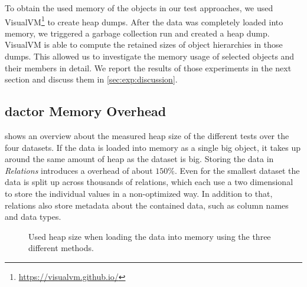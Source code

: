  To obtain the used memory of the objects in our test approaches, we used VisualVM\footnote{\url{https://visualvm.github.io/}} to create heap dumps.
  After the data was completely loaded into memory, we triggered a garbage collection run and created a heap dump.
  VisualVM is able to compute the retained sizes of object hierarchies in those dumps.
  This allowed us to investigate the memory usage of selected objects and their members in detail.
  We report the results of those experiments in the next section and discuss them in \cref{sec:exp:discussion}.

\subsection[Dactor Memory Overhead]{\Gls{dactor} Memory Overhead}

   shows an overview about the measured heap size of the different tests over the four datasets.
  If the data is loaded into memory as a single big  object, it takes up around the same amount of heap as the dataset is big.
  Storing the data in \textit{Relations} introduces a overhead of about $150 \%$.
  Even for the smallest dataset the data is split up across thousands of relations, which each use a two dimensional  to store the individual values in a non-optimized way.
  In addition to that, relations also store metadata about the contained data, such as column names and data types.
  
  \begin{figure}
    \centering
    \caption{Used heap size when loading the data into memory using the three different methods.}
    \label{fig:exp:general}
  \end{figure}

